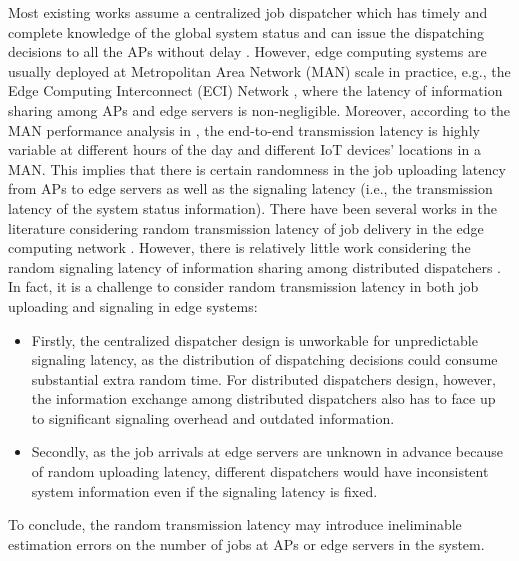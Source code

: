 Most existing works assume a centralized job dispatcher which has timely and complete knowledge of the global system status and can issue the dispatching decisions to all the APs without delay \cite{tan-online,IOTJ18-FanQ,mdp-globecom,mdp-tvt,MASS18-MengZ}.
However, edge computing systems are usually deployed at Metropolitan Area Network (MAN) scale in practice, e.g., the Edge Computing Interconnect (ECI) Network \cite{MAN-ECI}, where the latency of information sharing among APs and edge servers is non-negligible. Moreover, according to the MAN performance analysis in \cite{MAN-LATENCY}, the end-to-end transmission latency is highly variable at different hours of the day and different IoT devices' locations in a MAN. This implies that there is certain randomness in the job uploading latency from APs to edge servers as well as the signaling latency (i.e., the transmission latency of the {system status} information).
There have been several works in the literature considering random transmission latency of job delivery in the edge computing network \cite{latency-EDGE19,MOBIHOC19-ZhouZ,IOTJ18-FanQ,TOC19-LiuC,JSAC19-AlameddineHA}.
However, there is relatively little work considering the random signaling latency of information sharing among distributed dispatchers \cite{tan-online,TWC18-LyuX}.
In fact, it is a challenge to consider random transmission latency in both job uploading and signaling in edge systems:
\begin{itemize}
    \item Firstly, the centralized dispatcher design is unworkable for unpredictable signaling latency, as the distribution of dispatching decisions could consume substantial extra random time. For distributed dispatchers design, however, the information exchange among distributed dispatchers also has to face up to significant signaling overhead and outdated information.
    \item Secondly, as the job arrivals at edge servers are unknown in advance because of random uploading latency, different dispatchers would have inconsistent system information even if the signaling latency is fixed.
\end{itemize}

To conclude, the random transmission latency may introduce ineliminable estimation errors on the number of jobs at APs or edge servers in the system.



